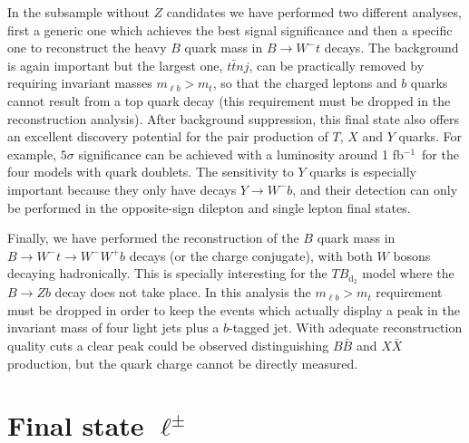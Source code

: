 \documentclass[12pt,a4paper]{article}
\newcommand{\fbin}{fb$^{-1}$}
\newcommand{\BB}{B \bar B}
\newcommand{\XX}{X \bar X}
\newcommand{\TBD}{TB_{\text{d}_2}}
\begin{document}
In the subsample without $Z$ candidates we have performed two different analyses, first a generic one which achieves the best signal significance and then a specific one to reconstruct the heavy $B$ quark mass in $B \to W^- t$ decays. The background is again important but the largest one, $t \bar t nj$, can be practically removed by requiring invariant masses $m_{\ell b} > m_t$, so that the charged leptons and $b$ quarks cannot result from a top quark decay (this requirement must be dropped in the reconstruction analysis). After background suppression, this final state also offers an excellent discovery potential for the pair production of $T$, $X$ and $Y$ quarks. For example, $5\sigma$ significance can be achieved with a luminosity around 1 \fbin\ for the four models with quark doublets.
The sensitivity to $Y$ quarks is especially important because they only have decays $Y \to W^- b$, and their detection can only be performed in the opposite-sign dilepton and single lepton final states.

Finally, we have performed the reconstruction of the $B$ quark mass in $B \to W^- t \to W^- W^+ b$ decays (or the charge conjugate), with both $W$ bosons decaying hadronically.
This is specially interesting for the $\TBD$ model where the $B \to Zb$ decay does not take place. 
In this analysis the $m_{\ell b} > m_t$ requirement must be dropped in order to keep the events which actually display a peak in the invariant mass of four light jets plus a $b$-tagged jet. With adequate reconstruction quality cuts a clear peak could be observed distinguishing $\BB$ and $\XX$ production, but the quark charge cannot be directly measured.




\section{Final state $\ell^\pm$}
\label{sec:1l}
\end{document}
